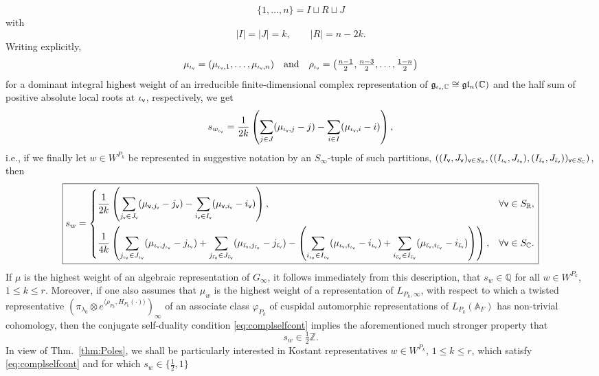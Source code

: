 \documentclass[a4paper,10pt]{amsart}
\theoremstyle{definition}
\numberwithin{equation}{section}
\def\R{\mathbb R}
\def\Z{\mathbb Z}
\def\A{\mathbb A}
\def\Q{\mathbb Q}
\def\C{\mathbb C}
\def\g{\mathfrak g}
\def\l{\mathfrak l}
\def\vv{{\sf v}} %
\begin{document}
$$
\{1,\dots,n\}=I\sqcup R\sqcup J
$$
with
$$
|I|=|J|=k,\qquad |R|=n-2k.
$$
Writing explicitly,
$$
\mu_{\iota_\vv}=(\mu_{{\iota_\vv},1},\dots,\mu_{{\iota_\vv},n}) \quad {\rm and}\quad \rho_{\iota_\vv}=\left(\tfrac{n-1}{2},\tfrac{n-3}{2},\dots,\tfrac{1-n}{2}\right)
$$
for a dominant integral highest weight of an irreducible finite-dimensional complex representation of $\g_{{\iota_\vv},\C}\cong \g\l_n(\C)$ and the half sum of positive absolute local roots at ${\iota_\vv}$, respectively, we get
$$
s_{w_{\iota_\vv}}
=
\frac{1}{2k}
\left(\sum_{j\in J}(\mu_{{\iota_\vv},j}-j)
-
\sum_{i\in I}(\mu_{{\iota_\vv},i}-i)\right),
$$
i.e., if we finally let $w\in W^{P_k}$ be represented in suggestive notation by an $S_\infty$-tuple of such partitions, $((I_\vv,J_\vv)_{\vv\in S_\R},((I_{\iota_\vv},J_{\iota_\vv}),(I_{\bar\iota_\vv},J_{\bar\iota_\vv}))_{\vv\in S_\C})$, then \fontsize{7.5}{10}\selectfont
\begin{equation}\label{sw}
\boxed{s_{w}
=
\begin{cases}
\displaystyle
\frac{1}{2k}
\left(\sum_{j_\vv\in J_\vv}(\mu_{{\vv},j_\vv}-j_\vv)
-
\sum_{i_\vv\in I_\vv}(\mu_{{\vv},i_\vv}-i_\vv)\right),
&\forall \vv\in S_\R,\\[16pt]
\displaystyle
\frac{1}{4k}
\left(\sum_{j_{\iota_\vv}\in J_{\iota_\vv}}(\mu_{{\iota_\vv},j_{\iota_\vv}}-j_{\iota_\vv})+\sum_{j_{\bar\iota_\vv}\in J_{\bar\iota_\vv}}(\mu_{{\bar\iota_\vv},j_{\bar\iota_\vv}}-j_{\bar\iota_\vv})
-
\left(\sum_{i_{\iota_\vv}\in I_{\iota_\vv}}(\mu_{{\iota_\vv},i_{\iota_\vv}}-i_{\iota_\vv})
+
\sum_{i_{\bar\iota_\vv}\in I_{\bar\iota_\vv}}(\mu_{{\bar\iota_\vv},i_{\bar\iota_\vv}}-i_{\bar\iota_\vv})\right)\right),
& \forall\vv\in S_\C.
\end{cases}}
\end{equation}\normalsize
If $\mu$ is the highest weight of an algebraic representation of $G_\infty$, it follows immediately from this description, that $s_w\in\Q$ for all $w\in W^{P_k}$, $1\leq k\leq r$. Moreover, if one also assumes that $\mu_w$ is the highest weight of a representation of $L_{P_k,\infty}$, with respect to which a twisted representative $(\pi_{\lambda_0}\otimes e^{\langle \rho_{P_k},H_{P_k}(\cdot)\rangle})_\infty$ of an associate class $\varphi_{P_k}$ of cuspidal automorphic representations of $L_{P_k}(\A_F)$ has non-trivial cohomology, then the conjugate self-duality condition \eqref{eq:complselfcont} implies the aforementioned much stronger property that 
$$s_w\in\tfrac12\Z.$$
In view of Thm.\ \ref{thm:Poles}, we shall be particularly interested in Kostant representatives $w\in W^{P_k}$, $1\leq k\leq r$, which satisfy \eqref{eq:complselfcont} and for which $s_w\in\{\tfrac12,1\}$
\end{document}
